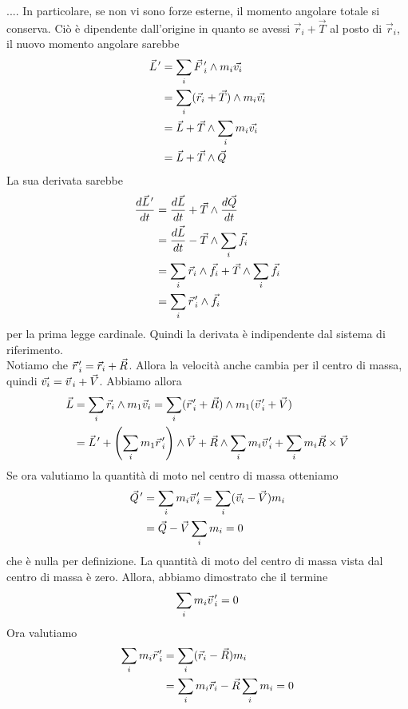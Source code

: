 \documentclass[a4paper]{article}
\begin{document}
....
In particolare, se non vi sono forze esterne, il momento angolare totale si conserva.
Ciò è dipendente dall'origine in quanto se avessi \(\vec{r}_i + \vec{T}\)
al posto di \(\vec{r}_i\), il nuovo momento angolare sarebbe
\newcommand{\pvec}[1]{\vec{#1}\mkern2mu\vphantom{#1}}
\begin{align*}
    \pvec{L}' &= \sum_i \pvec{F}_i' \wedge m_i \vec{v_i} \\
    &= \sum_i (\vec{r}_i + \vec{T}) \wedge m_i \vec{v_i} \\
    &= \vec{L} + \vec{T} \wedge \sum_i m_i \vec{v_i} \\
    &= \vec{L} + \vec{T} \wedge \vec{Q}
\end{align*}
La sua derivata sarebbe
\begin{align*}
    \frac{d\pvec{L}'}{dt} &= \frac{d\vec{L}}{dt} + \vec{T} \wedge \frac{d\vec{Q}}{dt} \\
    &= \frac{d\vec{L}}{dt} - \vec{T} \wedge \sum_i \vec{f}_i \\
    &= \sum_i \vec{r}_i \wedge \vec{f}_i + \vec{T} \wedge \sum_i \vec{f}_i \\
    &= \sum_i \pvec{r}_i' \wedge \vec{f}_i
\end{align*}
per la prima legge cardinale. Quindi la derivata è indipendente dal sistema di riferimento.
\\ Notiamo che \(\pvec{r}_i' = \vec{r}_i + \vec{R}\).
Allora la velocità anche cambia per il centro di massa, quindi
\(\vec{v_i} = \pvec{v}_i + \vec{V}\).
Abbiamo allora
\begin{align*}
    \vec{L} &= \sum_i \vec{r}_i \wedge m_1\vec{v}_i = \sum_i (\pvec{r}_i' + \vec{R}) \wedge m_1 (\pvec{v}_i' + \vec{V}) \\
    &= \pvec{L}' + \left(
        \sum_i m_1 \pvec{r}_i'
    \right) \wedge \vec{V} + \vec{R} \wedge
    \sum_i m_i \pvec{v}_i' + \sum_i m_i \vec{R} \times \vec{V}
\end{align*}
Se ora valutiamo la quantità di moto nel centro di massa otteniamo
\begin{align*}
    \pvec{Q}' &= \sum_i m_i \pvec{v}_i' = \sum_i (\vec{v}_i - \vec{V})m_i \\
    &= \vec{Q} - \vec{V} \sum_i m_i = 0
\end{align*}
che è nulla per definizione. La quantità di moto del centro di massa vista dal centro di massa è zero.
Allora, abbiamo dimostrato che il termine
\[
    \sum_i m_i \pvec{v}_i' = 0
\]
Ora valutiamo
\begin{align*}
    \sum_i m_i \pvec{r}_i' &= \sum_i (\vec{r}_i - \vec{R}) m_i \\
    &= \sum_i m_i\vec{r}_i - \vec{R} \sum_i m_i = 0
\end{align*}
\end{document}
